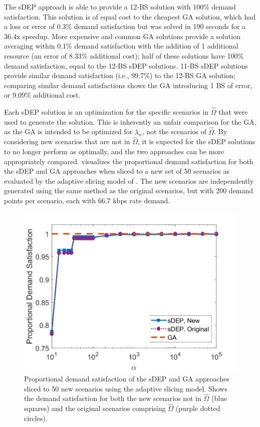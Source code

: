 \documentclass[12pt,dvipsnames]{report}
\begin{document}
The sDEP approach is able to provide a 12-BS solution with 100\% demand satisfaction.  This solution is of equal cost to the cheapest GA solution, which had a loss or error of 0.3\% demand satisfaction but was solved in 190 seconds for a 36.4x speedup.  More expensive and common GA solutions provide a solution averaging within 0.1\% demand satisfaction with the addition of 1 additional resource (an error of 8.33\% additional cost); half of these solutions have 100\% demand satisfaction, equal to the 12-BS sDEP solutions.  11-BS sDEP solutions provide similar demand satisfaction (i.e., 99.7\%) to the 12-BS GA solution; comparing similar demand satisfactions shows the GA introducing 1 BS of error, or 9.09\% additional cost.

Each sDEP solution is an optimization for the specific scenarios in $\hat{\Omega}$ that were used to generate the solution.  This is inherently an unfair comparison for the GA, as the GA is intended to be optimized for $\lambda_n$, not the scenarios of $\hat{\Omega}$.  By considering new scenarios that are not in $\hat{\Omega}$, it is expected for the sDEP solutions to no longer perform as optimally, and the two approaches can be more appropriately compared.   visualizes the proportional demand satisfaction for both the sDEP and GA approaches when sliced to a new set of 50 scenarios as evaluated by the adaptive slicing model of .  The new scenarios are independently generated using the same method as the original scenarios, but with 200 demand points per scenario, each with 66.7 kbps rate demand.

\begin{figure}[t]
	\centering
	\includegraphics[height=0.4\textheight]{Figures/Prelim_EvalO25_ComparisonSatisfactionFull}
	\caption[Demand satisfaction of the preliminary simulations evaluated against 50 new scenarios]{Proportional demand satisfaction of the sDEP and GA approaches sliced to 50 new scenarios using the adaptive slicing model. Shows the demand satisfaction for both the new scenarios not in $\hat{\Omega}$ (blue squares) and the original scenarios comprising $\hat{\Omega}$ (purple dotted circles).}
	\label{fig:Prelim_VWNCompSatisEval}
\end{figure}
\end{document}
